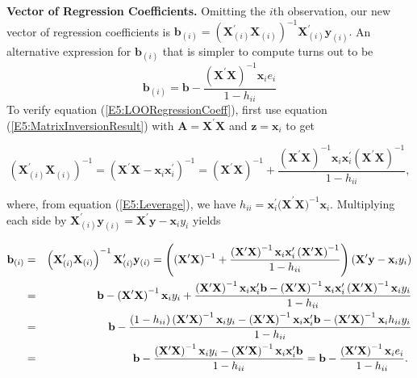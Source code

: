 \textbf{Vector of Regression Coefficients.} Omitting the $i$th
observation, our new vector of regression coefficients is $
\mathbf{b}_{(i)}=\left( \mathbf{X}_{(i)}^{\prime
}\mathbf{X}_{(i)}\right) ^{-1}\mathbf{X}_{(i)}^{\prime
}\mathbf{y}_{(i)}. $ An alternative expression for
$\mathbf{b}_{(i)}$ that is simpler to compute turns out to be
\begin{equation}\label{E5:LOORegressionCoeff}
\mathbf{b}_{(i)}=\mathbf{b}-\frac{\left( \mathbf{X}^{\prime }\mathbf{X}%
\right) ^{-1}\mathbf{x}_{i} e_{i}}{1-h_{ii}}
\end{equation}
To verify equation (\ref{E5:LOORegressionCoeff}), first use equation
(\ref{E5:MatrixInversionResult}) with $\mathbf{A}=\mathbf{X}^{\prime
}\mathbf{X}$ and $\mathbf{z}=\mathbf{x}_{i}$ to get
\begin{center}
\[
\left( \mathbf{X}_{(i)}^{\prime }\mathbf{X}_{(i)}\right) ^{-1}=(\mathbf{X}%
^{\prime }\mathbf{X-x}_{i}\mathbf{x}_{i}^{\prime })^{-1}=(\mathbf{X}^{\prime
}\mathbf{X})^{-1}+\frac{\left( \mathbf{X}^{\prime }\mathbf{X}\right) ^{-1}%
\mathbf{x}_{i}\mathbf{x}_{i}^{\prime }\left( \mathbf{X}^{\prime }\mathbf{X}%
\right) ^{-1}}{1-h_{ii}},
\]
\end{center}
where, from equation (\ref{E5:Leverage}), we have $h_{ii}=\mathbf{x}_{i}^{\prime }%
\mathbf{(X}^{\prime }\mathbf{X)}^{-1}\mathbf{x}_{i}$. Multiplying
each side
by $\mathbf{X}_{(i)}^{\prime }\mathbf{y}_{(i)}=\mathbf{X}^{\prime }\mathbf{y}%
-\mathbf{x}_{i}y_{i}$ yields

\begin{center}
\begin{eqnarray*}
\mathbf{b}_{(i)} &=&\left( \mathbf{X}_{(i)}^{\prime }\mathbf{X}_{(i)}\right)
^{-1}\mathbf{X}_{(i)}^{\prime }\mathbf{y}_{(i)}=\left( (\mathbf{X}^{\prime }%
\mathbf{X})^{-1}+\frac{\left( \mathbf{X}^{\prime }\mathbf{X}\right) ^{-1}%
\mathbf{x}_{i}\mathbf{x}_{i}^{\prime }\left( \mathbf{X}^{\prime }\mathbf{X}%
\right) ^{-1}}{1-h_{ii}}\right) \left( \mathbf{X}^{\prime }\mathbf{y}-%
\mathbf{x}_{i}y_{i}\right)  \\
&=&\mathbf{b}-\left( \mathbf{X}^{\prime }\mathbf{X}\right) ^{-1}\mathbf{x}%
_{i}y_{i}+\frac{\left( \mathbf{X}^{\prime }\mathbf{X}\right) ^{-1}\mathbf{x}%
_{i}\mathbf{x}_{i}^{\prime }\mathbf{b}-\left( \mathbf{X}^{\prime }\mathbf{X}%
\right) ^{-1}\mathbf{x}_{i}\mathbf{x}_{i}^{\prime }\left( \mathbf{X}^{\prime
}\mathbf{X}\right) ^{-1}\mathbf{x}_{i}y_{i}}{1-h_{ii}} \\
&=&\mathbf{b}-\frac{\left( 1-h_{ii}\right) \left( \mathbf{X}^{\prime }%
\mathbf{X}\right) ^{-1}\mathbf{x}_{i}y_{i}-\left( \mathbf{X}^{\prime }%
\mathbf{X}\right) ^{-1}\mathbf{x}_{i}\mathbf{x}_{i}^{\prime }\mathbf{b}%
-\left( \mathbf{X}^{\prime }\mathbf{X}\right) ^{-1}\mathbf{x}_{i}h_{ii}y_{i}%
}{1-h_{ii}} \\
&=&\mathbf{b}-\frac{\left( \mathbf{X}^{\prime }\mathbf{X}\right) ^{-1}%
\mathbf{x}_{i}y_{i}-\left( \mathbf{X}^{\prime }\mathbf{X}\right) ^{-1}%
\mathbf{x}_{i}\mathbf{x}_{i}^{\prime }\mathbf{b}}{1-h_{ii}}=\mathbf{b}-\frac{%
\left( \mathbf{X}^{\prime }\mathbf{X}\right) ^{-1}\mathbf{x}_{i} e_{i}}{%
1-h_{ii}}.\text{ }
\end{eqnarray*}%
\qquad
\end{center}

